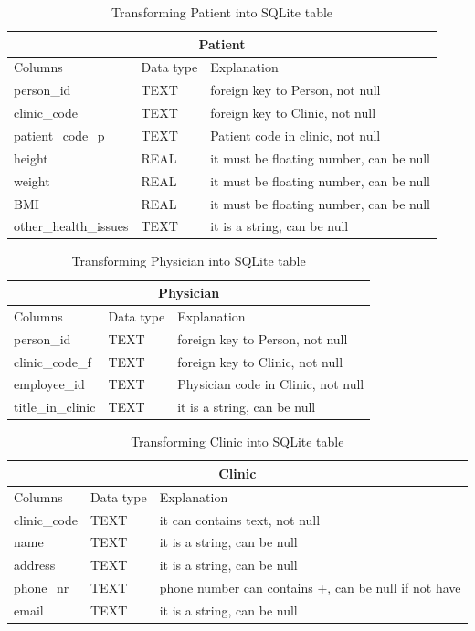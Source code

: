 \begin{table}
\begin{center}
\begin{tabular}{ |p{4cm}|p{1.8cm}|p{6.2cm}|  }
 \hline
 \multicolumn{3}{|c|}{Patient} \\
 \hline
 Columns& Data type & Explanation \\
 \hline
 person\_id& TEXT& foreign key to Person, not null\\
 clinic\_code& TEXT& foreign key to Clinic, not null\\
 patient\_code\_p& TEXT& Patient code in clinic, not null\\
 height& REAL& it must be floating number, can be null\\
 weight& REAL& it must be floating number, can be null\\
 BMI& REAL& it must be floating number, can be null\\
 other\_health\_issues& TEXT& it is a string, can be null\\
 \hline
\end{tabular}
\end{center}
\caption{Transforming Patient into SQLite table}
\label{tab:PatientTypeSQL}
\end{table}
\begin{table}
\begin{center}
\begin{tabular}{ |p{4cm}|p{1.8cm}|p{6.2cm}|  }
 \hline
 \multicolumn{3}{|c|}{Physician} \\
 \hline
 Columns& Data type & Explanation \\
 \hline
 person\_id& TEXT& foreign key to Person, not null\\
 clinic\_code\_f& TEXT& foreign key to Clinic, not null\\
 employee\_id& TEXT& Physician code in Clinic, not null\\
 title\_in\_clinic& TEXT& it is a string, can be null\\
 \hline
\end{tabular}
\end{center}
\caption{Transforming Physician into SQLite table}
\label{tab:PhysicianTypeSQL}
\end{table}
\begin{table}
\begin{center}
\begin{tabular}{ |p{4cm}|p{1.8cm}|p{6.2cm}|  }
 \hline
 \multicolumn{3}{|c|}{Clinic} \\
 \hline
 Columns& Data type & Explanation \\
 \hline
 clinic\_code& TEXT& it can contains text, not null\\
 name& TEXT& it is a string, can be null\\
 address& TEXT& it is a string, can be null\\
 phone\_nr& TEXT& phone number can contains +, can be null if not have\\
 email& TEXT& it is a string, can be null\\
 \hline
\end{tabular}
\end{center}
\caption{Transforming Clinic into SQLite table}
\label{tab:ClinicTypeSQL}
\end{table}
